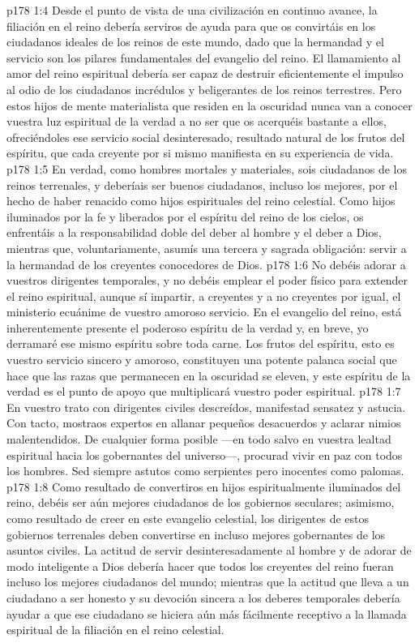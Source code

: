 \vs p178 1:4 Desde el punto de vista de una civilización en continuo avance, la filiación en el reino debería serviros de ayuda para que os convirtáis en los ciudadanos ideales de los reinos de este mundo, dado que la hermandad y el servicio son los pilares fundamentales del evangelio del reino. El llamamiento al amor del reino espiritual debería ser capaz de destruir eficientemente el impulso al odio de los ciudadanos incrédulos y beligerantes de los reinos terrestres. Pero estos hijos de mente materialista que residen en la oscuridad nunca van a conocer vuestra luz espiritual de la verdad a no ser que os acerquéis bastante a ellos, ofreciéndoles ese servicio social desinteresado, resultado natural de los frutos del espíritu, que cada creyente por si mismo manifiesta en su experiencia de vida.
\vs p178 1:5 En verdad, como hombres mortales y materiales, sois ciudadanos de los reinos terrenales, y deberíais ser buenos ciudadanos, incluso los mejores, por el hecho de haber renacido como hijos espirituales del reino celestial. Como hijos iluminados por la fe y liberados por el espíritu del reino de los cielos, os enfrentáis a la responsabilidad doble del deber al hombre y el deber a Dios, mientras que, voluntariamente, asumís una tercera y sagrada obligación: servir a la hermandad de los creyentes conocedores de Dios.
\vs p178 1:6 No debéis adorar a vuestros dirigentes temporales, y no debéis emplear el poder físico para extender el reino espiritual, aunque sí impartir, a creyentes y a no creyentes por igual, el ministerio ecuánime de vuestro amoroso servicio. En el evangelio del reino, está inherentemente presente el poderoso espíritu de la verdad y, en breve, yo derramaré ese mismo espíritu sobre toda carne. Los frutos del espíritu, esto es vuestro servicio sincero y amoroso, constituyen una potente palanca social que hace que las razas que permanecen en la oscuridad se eleven, y este espíritu de la verdad es el punto de apoyo que multiplicará vuestro poder espiritual.
\vs p178 1:7 En vuestro trato con dirigentes civiles descreídos, manifestad sensatez y astucia. Con tacto, mostraos expertos en allanar pequeños desacuerdos y aclarar nimios malentendidos. De cualquier forma posible ---en todo salvo en vuestra lealtad espiritual hacia los gobernantes del universo---, procurad vivir en paz con todos los hombres. Sed siempre astutos como serpientes pero inocentes como palomas.
\vs p178 1:8 Como resultado de convertiros en hijos espiritualmente iluminados del reino, debéis ser aún mejores ciudadanos de los gobiernos seculares; asimismo, como resultado de creer en este evangelio celestial, los dirigentes de estos gobiernos terrenales deben convertirse en incluso mejores gobernantes de los asuntos civiles. La actitud de servir desinteresadamente al hombre y de adorar de modo inteligente a Dios debería hacer que todos los creyentes del reino fueran incluso los mejores ciudadanos del mundo; mientras que la actitud que lleva a un ciudadano a ser honesto y su devoción sincera a los deberes temporales debería ayudar a que ese ciudadano se hiciera aún más fácilmente receptivo a la llamada espiritual de la filiación en el reino celestial.
